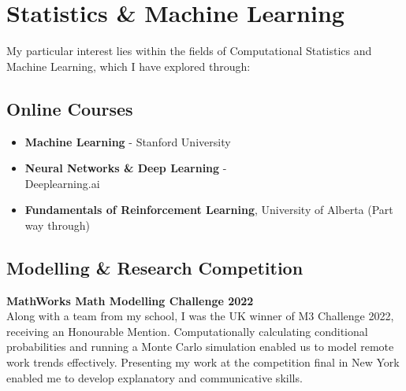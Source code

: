 \documentclass{Resume}
\begin{document}
	\section{Statistics \& Machine Learning}
	    My particular interest lies within the fields of Computational Statistics and Machine Learning, which I have explored through:
			
		\subsection{Online Courses}
			\begin{itemize}[itemsep=1mm, parsep=0pt]
				\item \textbf{Machine Learning} - Stanford University
				\item \textbf{Neural Networks \& Deep Learning} - \\ Deeplearning.ai 
				\item \textbf{Fundamentals of Reinforcement Learning}, University of Alberta (Part way through)
			\end{itemize}

		\subsection{Modelling \& Research Competition}
			\textbf{MathWorks Math Modelling Challenge 2022} 
			\\ Along with a team from my school, I was the UK winner of M3 Challenge 2022, receiving an Honourable Mention. Computationally calculating conditional probabilities and running a Monte Carlo simulation enabled us to model remote work trends effectively. Presenting my work at the competition final in New York enabled me to develop explanatory and communicative skills.


\end{document}
